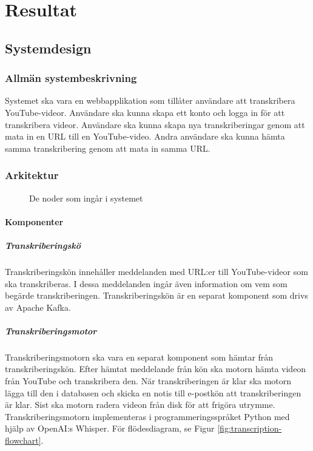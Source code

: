 \chapter{Resultat}

\section{Systemdesign}

\subsection{Allmän systembeskrivning}
Systemet ska vara en webbapplikation som tillåter användare att transkribera
YouTube-videor. Användare ska kunna skapa ett konto och logga in för att
transkribera videor. Användare ska kunna skapa nya transkriberingar genom att
mata in en URL till en YouTube-video. Andra användare ska kunna hämta samma
transkribering genom att mata in samma URL.

\subsection{Arkitektur}

\begin{figure}[h]
    \centering
    
    \caption{De noder som ingår i systemet}
    \label{fig:system-nodes}
\end{figure}

\subsubsection{Komponenter}

\paragraph{Transkriberingskö}
Transkriberingskön innehåller meddelanden med URL:er till YouTube-videor som
ska transkriberas. I dessa meddelanden ingår även information om vem som
begärde transkriberingen. Transkriberingskön är en separat komponent som drivs
av Apache Kafka.

\paragraph{Transkriberingsmotor}
Transkriberingsmotorn ska vara en separat komponent som hämtar från
transkriberingskön. Efter hämtat meddelande från kön ska motorn hämta videon
från YouTube och transkribera den. När transkriberingen är klar ska motorn
lägga till den i databasen och skicka en notis till e-postkön att
transkriberingen är klar. Sist ska motorn radera videon från disk för att
frigöra utrymme. Transkriberingsmotorn implementeras i programmeringsspråket
Python med hjälp av OpenAI:s Whisper. För flödesdiagram, se Figur
\ref{fig:transcription-flowchart}.

